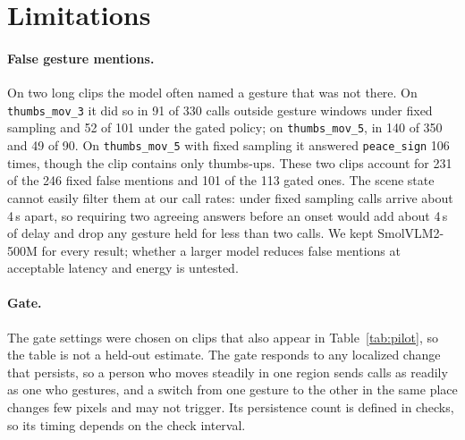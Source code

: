 \section{Limitations}
\label{sec:limitations}

\paragraph{False gesture mentions.}
On two long clips the model often named a gesture that was not there.
On \texttt{thumbs\_mov\_3} it did so in 91 of 330 calls outside gesture windows under fixed sampling and 52 of 101 under the gated policy; on \texttt{thumbs\_mov\_5}, in 140 of 350 and 49 of 90.
On \texttt{thumbs\_mov\_5} with fixed sampling it answered \texttt{peace\_sign} 106 times, though the clip contains only thumbs-ups.
These two clips account for 231 of the 246 fixed false mentions and 101 of the 113 gated ones.
The scene state cannot easily filter them at our call rates: under fixed sampling calls arrive about 4\,s apart, so requiring two agreeing answers before an onset would add about 4\,s of delay and drop any gesture held for less than two calls.
We kept SmolVLM2-500M for every result; whether a larger model reduces false mentions at acceptable latency and energy is untested.

\paragraph{Gate.}
The gate settings were chosen on clips that also appear in Table~\ref{tab:pilot}, so the table is not a held-out estimate.
The gate responds to any localized change that persists, so a person who moves steadily in one region sends calls as readily as one who gestures, and a switch from one gesture to the other in the same place changes few pixels and may not trigger.
Its persistence count is defined in checks, so its timing depends on the check interval.


